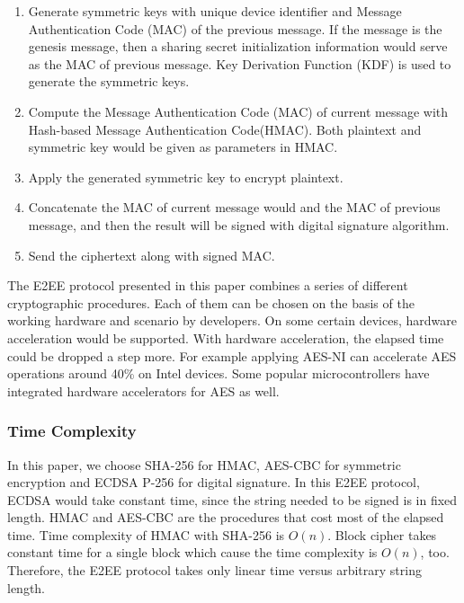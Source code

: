 \documentclass[conference]{IEEEtran}
\begin{document}
\begin{enumerate}
    \item Generate symmetric keys with unique device identifier and Message Authentication Code (MAC) of the previous message. If the message is the genesis message, then a sharing secret initialization information would serve as the MAC of previous message. Key Derivation Function (KDF) is used to generate the symmetric keys.
    \item Compute the Message Authentication Code (MAC) of current message with Hash-based Message Authentication Code(HMAC). Both plaintext and symmetric key would be given as parameters in HMAC.
    \item Apply the generated symmetric key to encrypt plaintext.
    \item Concatenate the MAC of current message would and the MAC of previous message, and then the result will be signed with digital signature algorithm.
    \item Send the ciphertext along with signed MAC.
\end{enumerate}

The E2EE protocol presented in this paper combines a series of different cryptographic procedures. Each of them can be chosen on the basis of the working hardware and scenario by developers. On some certain devices, hardware acceleration would be supported. With hardware acceleration, the elapsed time could be dropped a step more. For example applying AES-NI can accelerate AES operations around 40\% on Intel devices.\cite{AES-NI-Acceleration} Some popular microcontrollers have integrated hardware accelerators for AES as well.\cite{stm}

\subsubsection{Time Complexity}
In this paper, we choose SHA-256 for HMAC, AES-CBC for symmetric encryption and ECDSA P-256 for digital signature. In this E2EE protocol, ECDSA would take constant time, since the string needed to be signed is in fixed length. HMAC and AES-CBC are the procedures that cost most of the elapsed time. Time complexity of HMAC with SHA-256 is $O(n)$.\cite{hmac_time_complexity} Block cipher takes constant time for a single block which cause the time complexity is $O(n)$, too. Therefore, the E2EE protocol takes only linear time versus arbitrary string length.
\end{document}
